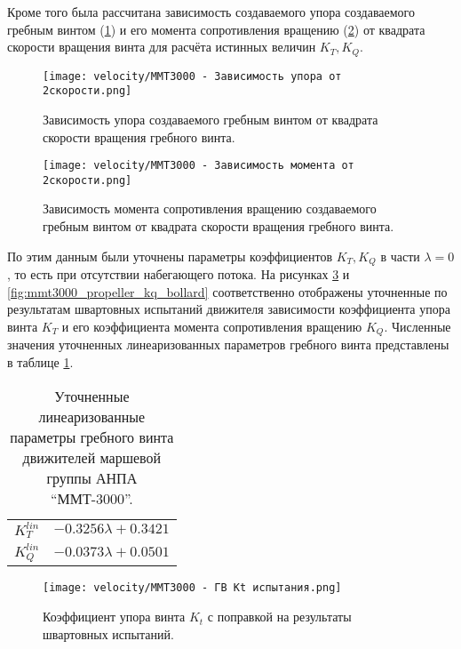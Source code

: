Кроме того была рассчитана зависимость создаваемого упора создаваемого гребным винтом (\ref{fig:mmt3000_thrust_rotation2}) и его момента сопротивления вращению (\ref{fig:mmt3000_torque_rotation2}) от квадрата скорости вращения винта для расчёта истинных величин $K_T,K_Q$.

\begin{figure}[ht]
    \centering
    \texttt{[image: velocity/MMT3000 - Зависимость упора от 2скорости.png]}
    \caption{Зависимость упора создаваемого гребным винтом от квадрата скорости вращения гребного винта.}
    \label{fig:mmt3000_thrust_rotation2}
\end{figure}

\begin{figure}[ht]
    \centering
    \texttt{[image: velocity/MMT3000 - Зависимость момента от 2скорости.png]}
    \caption{Зависимость момента сопротивления вращению создаваемого гребным винтом от квадрата скорости вращения гребного винта.}
    \label{fig:mmt3000_torque_rotation2}
\end{figure}

По этим данным были уточнены параметры коэффициентов $K_T, K_Q$ в части $\lambda = 0$, то есть при отсутствии набегающего потока.
На рисунках \ref{fig:mmt3000_propeller_kt_bollard} и \ref{fig:mmt3000_propeller_kq_bollard} соответственно отображены уточненные по результатам швартовных испытаний движителя зависимости коэффициента упора винта $K_T$ и его коэффициента момента сопротивления вращению $K_Q$.
Численные значения уточненных линеаризованных параметров гребного винта представлены в таблице \ref{tab:mmt3000_propeller_bollard}.

\begin{table}
    \caption{Уточненные линеаризованные параметры гребного винта движителей маршевой группы АНПА ``ММТ-3000''.}
    \label{tab:mmt3000_propeller_bollard}
    \centering
    \begin{tabular}{ll}
        $K_T^{lin}$ & $-0.3256\lambda + 0.3421$ \\
        $K_Q^{lin}$ & $-0.0373\lambda + 0.0501$ \\
    \end{tabular}
\end{table}

\begin{figure}[ht]
    \centering
    \texttt{[image: velocity/MMT3000 - ГВ Kt испытания.png]}
    \caption{Коэффициент упора винта $K_t$ с поправкой на результаты швартовных испытаний.}
    \label{fig:mmt3000_propeller_kt_bollard}
\end{figure}

